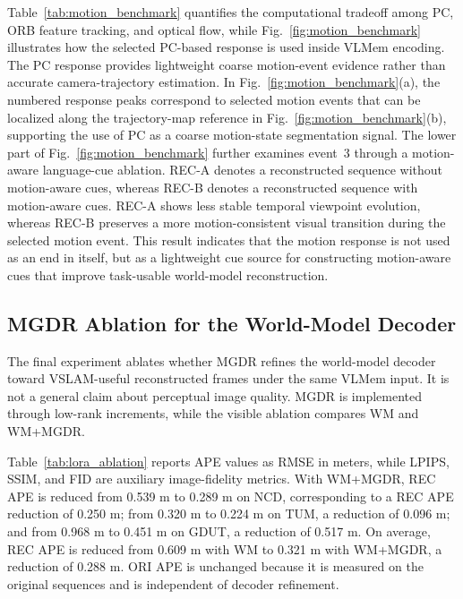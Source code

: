 Table~\ref{tab:motion_benchmark} quantifies the computational tradeoff among PC, ORB feature tracking, and optical flow, while Fig.~\ref{fig:motion_benchmark} illustrates how the selected PC-based response is used inside VLMem encoding. The PC response provides lightweight coarse motion-event evidence rather than accurate camera-trajectory estimation. In Fig.~\ref{fig:motion_benchmark}(a), the numbered response peaks correspond to selected motion events that can be localized along the trajectory-map reference in Fig.~\ref{fig:motion_benchmark}(b), supporting the use of PC as a coarse motion-state segmentation signal. The lower part of Fig.~\ref{fig:motion_benchmark} further examines event~3 through a motion-aware language-cue ablation. REC-A denotes a reconstructed sequence without motion-aware cues, whereas REC-B denotes a reconstructed sequence with motion-aware cues. REC-A shows less stable temporal viewpoint evolution, whereas REC-B preserves a more motion-consistent visual transition during the selected motion event. This result indicates that the motion response is not used as an end in itself, but as a lightweight cue source for constructing motion-aware cues that improve task-usable world-model reconstruction.

\subsection{MGDR Ablation for the World-Model Decoder}
\label{subsec:lora_ablation}

The final experiment ablates whether MGDR refines the world-model decoder toward VSLAM-useful reconstructed frames under the same VLMem input. It is not a general claim about perceptual image quality. MGDR is implemented through low-rank increments, while the visible ablation compares WM and WM+MGDR.



Table~\ref{tab:lora_ablation} reports APE values as RMSE in meters, while LPIPS, SSIM, and FID are auxiliary image-fidelity metrics. With WM+MGDR, REC APE is reduced from 0.539 m to 0.289 m on NCD, corresponding to a REC APE reduction of 0.250 m; from 0.320 m to 0.224 m on TUM, a reduction of 0.096 m; and from 0.968 m to 0.451 m on GDUT, a reduction of 0.517 m. On average, REC APE is reduced from 0.609 m with WM to 0.321 m with WM+MGDR, a reduction of 0.288 m. ORI APE is unchanged because it is measured on the original sequences and is independent of decoder refinement.

